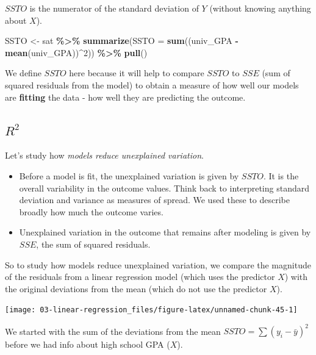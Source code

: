 \documentclass[
]{book}
\newenvironment{Shaded}{\begin{snugshade}}{\end{snugshade}}
\newcommand{\AttributeTok}[1]{\textcolor[rgb]{0.13,0.29,0.53}{#1}}
\newcommand{\DecValTok}[1]{\textcolor[rgb]{0.00,0.00,0.81}{#1}}
\newcommand{\FunctionTok}[1]{\textcolor[rgb]{0.13,0.29,0.53}{\textbf{#1}}}
\newcommand{\NormalTok}[1]{#1}
\newcommand{\OtherTok}[1]{\textcolor[rgb]{0.56,0.35,0.01}{#1}}
\newcommand{\SpecialCharTok}[1]{\textcolor[rgb]{0.81,0.36,0.00}{\textbf{#1}}}
\providecommand{\tightlist}{%
  \setlength{\itemsep}{0pt}\setlength{\parskip}{0pt}}
\begin{document}
\(SSTO\) is the numerator of the standard deviation of \(Y\) (without knowing anything about \(X\)).

\begin{Shaded}
\begin{Highlighting}[]
\NormalTok{SSTO }\OtherTok{\textless{}{-}}\NormalTok{ sat }\SpecialCharTok{\%\textgreater{}\%}
  \FunctionTok{summarize}\NormalTok{(}\AttributeTok{SSTO =} \FunctionTok{sum}\NormalTok{((univ\_GPA }\SpecialCharTok{{-}} \FunctionTok{mean}\NormalTok{(univ\_GPA))}\SpecialCharTok{\^{}}\DecValTok{2}\NormalTok{)) }\SpecialCharTok{\%\textgreater{}\%}
  \FunctionTok{pull}\NormalTok{()}
\end{Highlighting}
\end{Shaded}

We define \(SSTO\) here because it will help to compare \(SSTO\) to \(SSE\) (sum of squared residuals from the model) to obtain a measure of how well our models are \textbf{fitting} the data - how well they are predicting the outcome.

\subsection{\texorpdfstring{\(R^2\)}{R\^{}2}}\label{r2}

Let's study how \emph{models reduce unexplained variation}.

\begin{itemize}
\tightlist
\item
  Before a model is fit, the unexplained variation is given by \(SSTO\). It is the overall variability in the outcome values. Think back to interpreting standard deviation and variance as measures of spread. We used these to describe broadly how much the outcome varies.
\item
  Unexplained variation in the outcome that remains after modeling is given by \(SSE\), the sum of squared residuals.
\end{itemize}

So to study how models reduce unexplained variation, we compare the magnitude of the residuals from a linear regression model (which uses the predictor \(X\)) with the original deviations from the mean (which do not use the predictor \(X\)).

\begin{center}\texttt{[image: 03-linear-regression\_files/figure-latex/unnamed-chunk-45-1]} \end{center}

We started with the sum of the deviations from the mean \(SSTO = \sum{(y_i - \bar{y})^2}\) before we had info about high school GPA (\(X\)).
\end{document}
